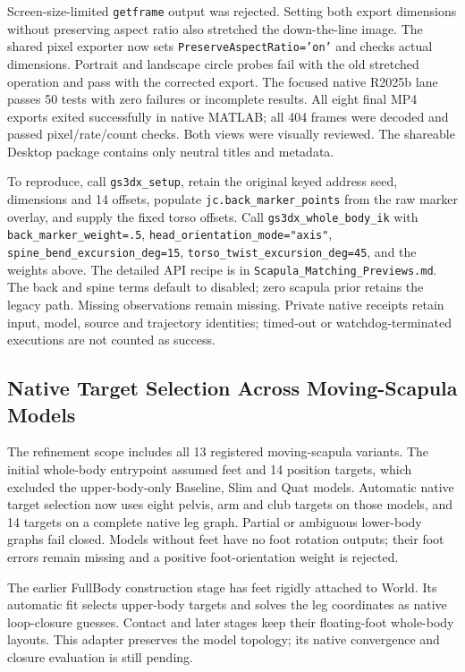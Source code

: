 \documentclass[11pt,a4paper]{article}
\begin{document}
Screen-size-limited \texttt{getframe} output was rejected. Setting both
export dimensions without preserving aspect ratio also stretched the
down-the-line image. The shared pixel exporter now sets
\texttt{PreserveAspectRatio='on'} and checks actual dimensions. Portrait
and landscape circle probes fail with the old stretched operation and
pass with the corrected export. The focused native R2025b lane passes
50 tests with zero failures or incomplete results. All eight final MP4
exports exited successfully in native MATLAB; all 404 frames were decoded
and passed pixel/rate/count checks. Both views were visually reviewed.
The shareable Desktop package contains only neutral titles and metadata.

To reproduce, call \texttt{gs3dx\_setup}, retain the original keyed address
seed, dimensions and 14 offsets, populate
\texttt{jc.back\_marker\_points} from the raw marker overlay, and supply
the fixed torso offsets. Call \texttt{gs3dx\_whole\_body\_ik} with
\texttt{back\_marker\_weight=.5},
\texttt{head\_orientation\_mode="axis"},
\texttt{spine\_bend\_excursion\_deg=15},
\texttt{torso\_twist\_excursion\_deg=45}, and the weights above.
The detailed API recipe is in \texttt{Scapula\_Matching\_Previews.md}.
The back and spine terms default to disabled; zero scapula prior retains
the legacy path. Missing observations remain missing. Private native
receipts retain input, model, source and trajectory identities; timed-out
or watchdog-terminated executions are not counted as success.

\subsection{Native Target Selection Across Moving-Scapula Models}
The refinement scope includes all 13 registered moving-scapula variants.
The initial whole-body entrypoint assumed feet and 14 position targets,
which excluded the upper-body-only Baseline, Slim and Quat models.
Automatic native target selection now uses eight pelvis, arm and club
targets on those models, and 14 targets on a complete native leg graph.
Partial or ambiguous lower-body graphs fail closed. Models without feet
have no foot rotation outputs; their foot errors remain missing and a
positive foot-orientation weight is rejected.

The earlier FullBody construction stage has feet rigidly attached to
World. Its automatic fit selects upper-body targets and solves the leg
coordinates as native loop-closure guesses. Contact and later stages keep
their floating-foot whole-body layouts. This adapter preserves the model
topology; its native convergence and closure evaluation is still pending.
\end{document}

